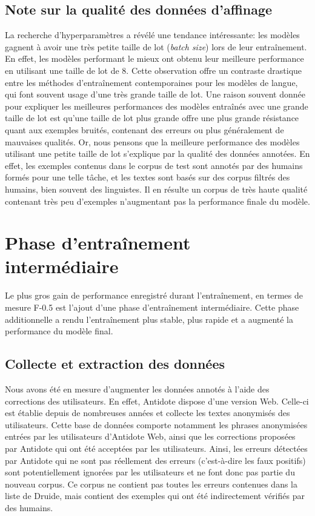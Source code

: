 \documentclass[12pt,twoside,rapport]{dms}
\theoremstyle{definition}
\numberwithin{equation}{section}
\numberwithin{table}{chapter}
\numberwithin{figure}{chapter}
\begin{document}
\subsection{Note sur la qualité des données d'affinage}
La recherche d'hyperparamètres a révélé une tendance intéressante: les modèles
gagnent à avoir une très petite taille de lot (\textit{batch size}) lors de
leur entraînement. En effet, les modèles performant le mieux ont obtenu leur
meilleure performance en utilisant une taille de lot de 8. Cette observation
offre un contraste drastique entre les méthodes d'entraînement contemporaines
pour les modèles de langue, qui font souvent usage d'une très grande taille de
lot. Une raison souvent donnée pour expliquer les meilleures performances des
modèles entraînés avec une grande taille de lot est qu'une taille de lot plus
grande offre une plus grande résistance quant aux exemples bruités, contenant
des erreurs ou plus généralement de mauvaises qualités. Or, nous pensons que la
meilleure performance des modèles utilisant une petite taille de lot s'explique
par la qualité des données annotées. En effet, les exemples contenus dans le
corpus de test sont annotés par des humains formés pour une telle tâche, et les
textes sont basés sur des corpus filtrés des humains, bien souvent des
linguistes. Il en résulte un corpus de très haute qualité contenant très peu
d'exemples n'augmentant pas la performance finale du modèle.

\section{Phase d'entraînement intermédiaire}
Le plus gros gain de performance enregistré durant l'entraînement, en termes de
mesure F-0.5 est l'ajout d'une phase d'entraînement intermédiaire. Cette phase
additionnelle a rendu l'entraînement plus stable, plus rapide et a augmenté la
performance du modèle final.

\subsection{Collecte et extraction des données}
Nous avons été en mesure d'augmenter les données annotés à l'aide des
corrections des utilisateurs. En effet, Antidote dispose d'une version Web.
Celle-ci est établie depuis de nombreuses années et collecte les textes
anonymisés des utilisateurs. Cette base de données comporte notamment les
phrases anonymisées entrées par les utilisateurs d'Antidote Web, ainsi que les
corrections proposées par Antidote qui ont été acceptées par les utilisateurs.
Ainsi, les erreurs détectées par Antidote qui ne sont pas réellement des
erreurs (c'est-à-dire les faux positifs) sont potentiellement ignorées par les
utilisateurs et ne font donc pas partie du nouveau corpus. Ce corpus ne
contient pas toutes les erreurs contenues dans la liste de Druide, mais
contient des exemples qui ont été indirectement vérifiés par des humains.\\
\end{document}
